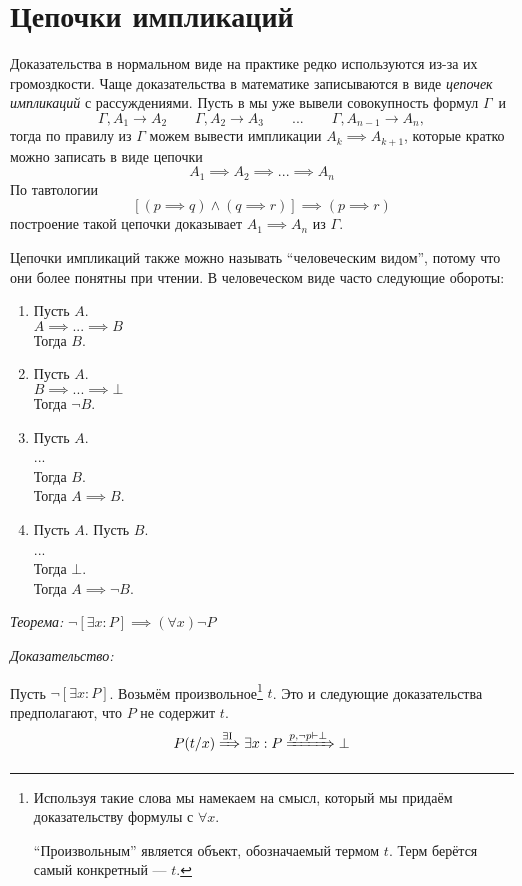 \section{Цепочки импликаций}

Доказательства в нормальном виде на практике редко используются из-за их
громоздкости.
Чаще доказательства в математике записываются в виде {\it цепочек импликаций}
с рассуждениями.
Пусть в мы уже вывели совокупность формул $\Gamma$~и
\[
	\Gamma,A_1\to A_2\qquad \Gamma,A_2\to A_3
	\qquad  ... \qquad \Gamma,A_{n-1}\to A_{n},
\]
тогда по правилу \implic{} из $\Gamma$ можем вывести импликации
${A_{k}\implies A_{k+1}}$, которые кратко можно записать в виде цепочки
\[
	A_1\implies A_2\implies ...\implies A_{n}
\]
По тавтологии
\[
	[(p\implies q)\land (q\implies r)]\implies (p\implies r)
\]
построение такой цепочки доказывает $A_1\implies A_{n}$ из $\Gamma$.

Цепочки импликаций также можно называть ``человеческим видом'', потому что они более
понятны при чтении.
В человеческом виде часто следующие обороты:
\begin{multicols}{2}
	\begin{enumerate}[label=(\roman*)]
		\item{}
		Пусть $A$.\\
		$A\implies...\implies B$\\
		Тогда $B$.
		\item{}
		Пусть $A$.\\
		$B\implies ...\implies \bot$\\
		Тогда $\lnot B$.
		\item{}
		Пусть $A$.\\
		...\\
		Тогда $B$.\\
		Тогда $A\implies B$.
		\item{}
		Пусть $A$. Пусть $B$.\\
		...\\
		Тогда $\bot$.\\
		Тогда $A\implies \lnot B$.\\
	\end{enumerate}
\end{multicols}

\vspace{1em}
{\it Теорема:} $\lnot[\exists x:P]\implies (\forall x)\lnot P$

{\it Доказательство:}

Пусть ${\lnot[\exists x:P]}$.
Возьмём произвольное\footnote{
	Используя такие слова мы намекаем на смысл, который мы придаём доказательству
	формулы с $\forall x$.

	``Произвольным'' является объект, обозначаемый термом $t$.
	Терм берётся самый конкретный --- $t$.
} $t$. Это и следующие доказательства
предполагают, что $P$ не содержит $t$.
\[
	P(t/x)\xRightarrow{\text{$\exists$I}} \exists x:P
	\xRightarrow{p,\lnot p\vdash\bot} \bot
\]

